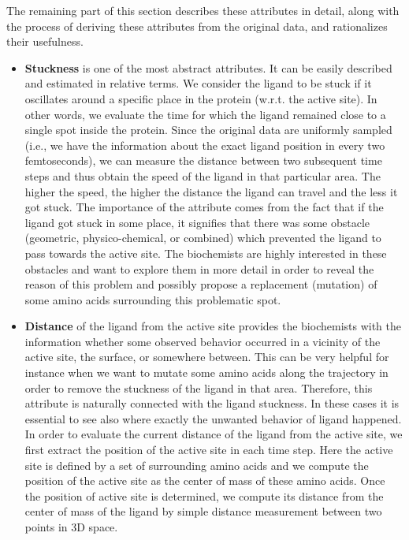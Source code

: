 \documentclass[twocolumn]{bmcart}%
\begin{document}
The remaining part of this section describes these attributes in detail, along with the process of deriving these attributes from the original data, and rationalizes their usefulness.
    

\begin{itemize}

\item \textbf{Stuckness} is one of the most abstract attributes. 
It can be easily described and estimated in relative terms. 
We consider the ligand to be stuck if it oscillates around a specific place in the protein (w.r.t. the active site).  
In other words, we evaluate the time for which the ligand remained close to a single spot inside the protein. 
Since the original data are uniformly sampled (i.e., we have the information about the exact ligand position in every two femtoseconds), we can measure the distance between two subsequent time steps and thus obtain the speed of the ligand in that particular area. 
The higher the speed, the higher the distance the ligand can travel and the less it got stuck.
The importance of the attribute comes from the fact that if the ligand got stuck in some place, it signifies that there was some obstacle (geometric, physico-chemical, or combined) which prevented the ligand to pass towards the active site.
The biochemists are highly interested in these obstacles and want to explore them in more detail in order to reveal the reason of this problem and possibly propose a replacement (mutation) of some amino acids surrounding this problematic spot.

\item \textbf{Distance} of the ligand from the active site provides the biochemists with the information whether some observed behavior occurred in a vicinity of the active site, the surface, or somewhere between. 
This can be very helpful for instance when we want to mutate some amino acids along the trajectory in order to remove the stuckness of the ligand in that area. 
Therefore, this attribute is naturally connected with the ligand stuckness.
In these cases it is essential to see also where exactly the unwanted behavior of ligand happened.
In order to evaluate the current distance of the ligand from the active site, we first extract the position of the active site in each time step. 
Here the active site is defined by a set of surrounding amino acids and we compute the position of the active site as the center of mass of these amino acids. 
Once the position of active site is determined, we compute its distance from the center of mass of the ligand by simple distance measurement between two points in 3D space.
      

\end{itemize}
\end{document}
